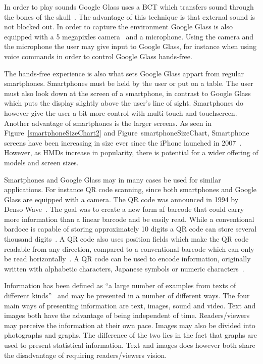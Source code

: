 In order to play sounds Google Glass uses a BCT which transfers sound through the bones of the skull~\cite{GlassSpecs}. The advantage of this technique is that external sound is not blocked out. In order to capture the environment Google Glass is also equipped with a 5 megapixles camera~\cite{GlassSpecs} and a microphone. Using the camera and the microphone the user may give input to Google Glass, for instance when using voice commands in order to control Google Glass hands-free.

The hands-free experience is also what sets Google Glass appart from regular smartphones. Smartphones must be held by the user or put on a table. The user must also look down at the screen of a smartphone, in contrast to Google Glass which puts the display slightly above the user's line of sight. Smartphones do however give the user a bit more control with multi-touch and touchscreen. Another advantage of smartphones is the larger screens. As seen in Figure~\ref{smartphoneSizeChart2} and Figure~{smartphoneSizeChart}, Smartphone screens have been increasing in size ever since the iPhone launched in 2007~\cite{smartphoneSizeChart2}. However, as HMDs increase in popularity, there is potential for a wider offering of models and screen sizes.

Smartphones and Google Glass may in many cases be used for similar applications. For instance QR code scanning, since both smartphones and Google Glass are equipped with a camera. The QR code was announced in 1994 by Denso Wave~\cite{qrCodeHistory}. The goal was to create a new form af barcode that could carry more information than a linear barcode and be easily read. While a conventional bardoce is capable of storing approximately 10 digits a QR code can store several thousand digits~\cite{qrCodeType}. A QR code also uses position fields which make the QR code readable from any direction, compared to a conventional barcode which can only be read horizontally~\cite{qrCodeAbout}. A QR code can be used to encode information, originally written with alphabetic characters, Japanese symbols or numeric characters~\cite{qrCodeVersion}. 

Information has been defined as ``a large number of examples from texts of different kinds''~\cite{informationDef1} and may be presented in a number of different ways. The four main ways of presenting information are text, images, sound and video. Text and images both have the advantage of being independent of time. Readers/viewers may perceive the information at their own pace. Images may also be divided into photographs and graphs. The difference of the two lies in the fact that graphs are used to present statistical information. Text and images does however both share the disadvantage of requiring readers/viewers vision.


